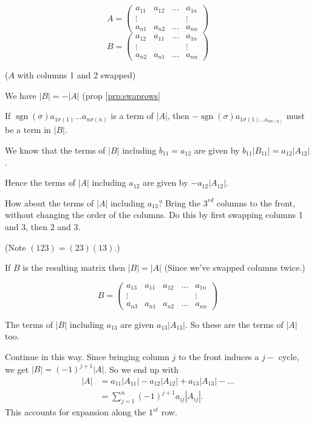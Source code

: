 \documentclass{article}
\theoremstyle{definition} \newtheorem*{definition}{Definition}
\DeclareMathOperator{\sgn}{sgn} \DeclareMathOperator{\id}{id}
\begin{document}
    \[
    A = \left( 
    \begin{matrix}
      a_{11} & a_{12} & \dots & a_{1n} \\
      \vdots &        &       & \vdots \\
      a_{n1} & a_{n2} & \dots & a_{nn}
    \end{matrix}
    \right)
  \]
  \[
    B = \left( 
    \begin{matrix}
      a_{12} & a_{11} & \dots & a_{1n} \\
      \vdots &        &       & \vdots \\
      a_{n2} & a_{n1} & \dots & a_{nn}
    \end{matrix}
    \right)
    \]

   ($A$ with columns 1 and 2 swapped)

   We have $|B| = -|A|$ (prop \ref{prp:swaprows}

   If $\sgn(\sigma)a_{1\sigma(1)}\dots a_{n\sigma(n)}$ is a term of $|A|$, 
   then $-\sgn(\sigma)a_{1\sigma(1)\dots a_{n\sigma(n)}}$ 
   must be a term in $|B|$.

   We know that the terms of $|B|$ including $b_{11}=a_{12}$ are
   given by $b_{11}|B_{11}| = a_{12}|A_{12}|$.

   Hence the terms of $|A|$ including $a_{12}$ are given by  $-a_{12}|A_{12}|$.

   How about the terms of $|A|$ including $a_{13}$? 
   Bring the $3^{rd}$ columns to the front, without changing the order
   of the columns. Do this by first swapping columns 1 and 3, then 2 and 3.

   (Note $(123)=(23)(13)$.)
   
   If $B$ is the resulting matrix then 
   $|B|=|A|$ (Since we've swapped columns twice.)

   \[
   B = \left( 
   \begin{matrix}
     a_{13} & a_{11} & a_{12} & \dots & a_{1n} \\
     \vdots &        &        &       & \vdots \\
     a_{n3} & a_{n1} & a_{n2} & \dots & a_{nn}
   \end{matrix}
   \right)
   \]
  

   The  terms of $|B|$ including $a_{13}$ are given $a_{13}|A_{13}|$. So
   these are the terms of $|A|$ too.

   Continue in this way. Since bringing column $j$ to the front induces a $j-$
   cycle, we get $|B|=(-1)^{j+1}|A|$. So we end up with 
   \begin{align*}
     |A| &= a_{11}|A_{11}| - a_{12}|A_{12}| + a_{13}|A_{13}| - \dots\\
     &= \sum_{j=1}^n (-1)^{j+1}a_{ij}|A_{ij}|.
   \end{align*}
   This accounts for expansion along the $1^{st}$ row.
\end{document}
